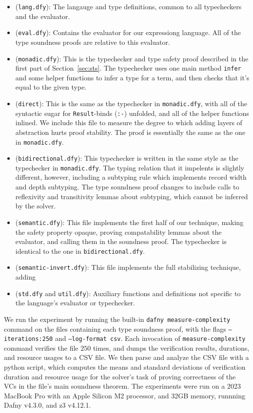 \documentclass[sigplan,review,screen,anonymous]{acmart}
\begin{document}
\begin{itemize}
  \item (\texttt{lang.dfy}): The langauge and type definitions, common to all typecheckers and the evaluator.
  \item (\texttt{eval.dfy}): Contains the evaluator for our expressiong language. All of the type soundness proofs are relative to this evaluator.
  \item (\texttt{monadic.dfy}): This is the typechecker and type safety proof described in
  the first part of Section~\ref{sec:sts}.  The typechecker uses one main method
  \texttt{infer} and some helper functions to infer a type for a term, and then checks
  that it's equal to the given type.
  \item (\texttt{direct}): This is the same as the typechecker in \texttt{monadic.dfy}, with all of the
  syntactic sugar for \texttt{Result}-binds (\texttt{:-}) unfolded, and all of the helper
  functions inlined. We include this file to measure the degree to which adding
  layers of abstraction hurts proof stability. The proof is essentially the same as the one in \texttt{monadic.dfy}.
  \item (\texttt{bidirectional.dfy}): This typechecker is written in the same style as the typechecker in \texttt{monadic.dfy}. The typing relation that it impelents is slightly different,
        however, including a subtyping rule which implements record width and depth subtyping.
        The type soundness proof changes to include calls to reflexivity and transitivity lemmas about subtyping, which cannot be inferred by the solver.
  \item (\texttt{semantic.dfy}):
        This file implements the first half of our technique, making the safety
        property opaque, proving compatability lemmas about the evaluator, and
        calling them in the soundness proof.  The typechecker is identical to
        the one in \texttt{bidirectional.dfy}.
  \item (\texttt{semantic-invert.dfy}): This file implements the full stabilizing technique, adding
  \item (\texttt{std.dfy} and \texttt{util.dfy}): Auxiliary functions and definitions not specific to the language's evaluator or typechecker.
\end{itemize}

We run the experiment by running the built-in \texttt{dafny measure-complexity}
command on the files containing each type soundness proof, with the flags \texttt{--iterations:250} and \texttt{--log-format csv}.
Each invocation of \texttt{measure-complexity} command verifies the file $250$ times, and dumps
the verification results, durations, and resource usages to a CSV file. We then parse and analyze the CSV
file with a python script, which computes the means and standard deviations of verification duration and resource usage for the solver's task of proving correctness
of the VCs in the file's main soundness theorem.
The experiments were run on a 2023 MacBook Pro with an Apple Silicon M2 processor, and 32GB memory, runnning Dafny v4.3.0, and z3 v4.12.1.
\end{document}
